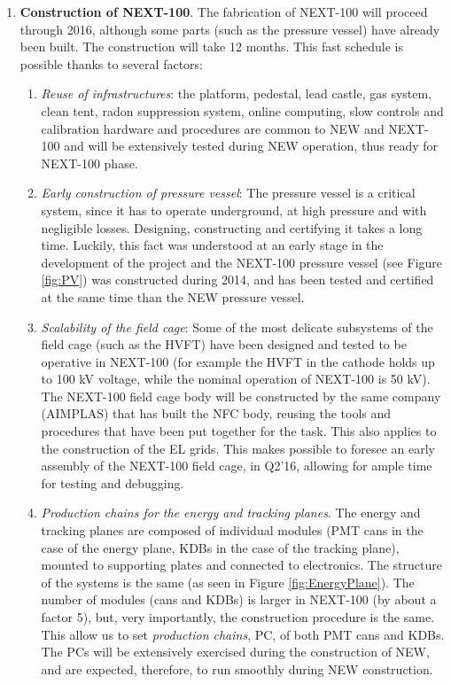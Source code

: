 \begin{enumerate}
\item {\bf Construction of NEXT-100}. The fabrication of NEXT-100 will proceed through 2016, although some parts (such as the pressure vessel) have already been built. 
The construction will take 12 months. This fast schedule is possible thanks to several factors:
\begin{enumerate}
\item {\em Reuse of infrastructures}: the platform, pedestal, lead castle, gas system, clean tent, radon suppression system, online computing, slow controls and calibration hardware and procedures are common to NEW and NEXT-100 and will be extensively tested during NEW operation, thus ready for NEXT-100 phase.
\item {\em Early construction of pressure vessel}: The pressure vessel is a critical system, since it has to operate underground, at high pressure and with negligible losses. Designing, constructing and certifying it takes a long time. Luckily, this fact was understood at an early stage in the development of the project and the NEXT-100 pressure vessel (see Figure \ref{fig:PV}) was constructed during 2014, and has been tested and certified at the same time than the NEW pressure vessel. 
\item {\em Scalability of the field cage}: Some of the most delicate subsystems of the field cage (such as the HVFT) have been designed and tested to be operative in NEXT-100 (for example the HVFT in the cathode holds up to 100 kV voltage, while the nominal operation of NEXT-100 is 50 kV). The NEXT-100 field cage body will be constructed by the same company (AIMPLAS) that has built the NFC body, reusing the tools and procedures that have been put together for the task. This also applies to the construction of the EL grids. 
This makes possible to foresee an early assembly of the NEXT-100 field cage, in Q2'16, allowing for ample time for testing and debugging.

\item {\em Production chains for the energy and tracking planes}. The energy and tracking planes are composed of individual modules (PMT cans in the case of the energy plane, KDBs in the case of the tracking plane), mounted to supporting plates and connected to electronics. The structure of the systems is the same (as seen in Figure \ref{fig:EnergyPlane}). The number of modules (cans and KDBs) is larger in NEXT-100 (by about a factor 5), but, very importantly, the construction procedure is the same. This allow us to set {\em production chains}, PC, of both PMT cans and KDBs. The PCs will be extensively exercised during the construction of NEW, and are expected, therefore, to run smoothly during NEW construction.  


\end{enumerate}
\end{enumerate}
